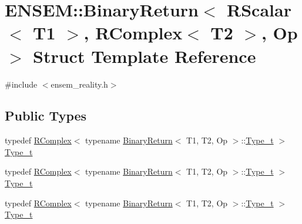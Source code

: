 \hypertarget{structENSEM_1_1BinaryReturn_3_01RScalar_3_01T1_01_4_00_01RComplex_3_01T2_01_4_00_01Op_01_4}{}\section{E\+N\+S\+EM\+:\+:Binary\+Return$<$ R\+Scalar$<$ T1 $>$, R\+Complex$<$ T2 $>$, Op $>$ Struct Template Reference}
\label{structENSEM_1_1BinaryReturn_3_01RScalar_3_01T1_01_4_00_01RComplex_3_01T2_01_4_00_01Op_01_4}


{\ttfamily \#include $<$ensem\+\_\+reality.\+h$>$}

\subsection*{Public Types}
\begin{DoxyCompactItemize}
\item 
typedef \mbox{\hyperlink{classENSEM_1_1RComplex}{R\+Complex}}$<$ typename \mbox{\hyperlink{structENSEM_1_1BinaryReturn}{Binary\+Return}}$<$ T1, T2, Op $>$\+::\mbox{\hyperlink{structENSEM_1_1BinaryReturn_3_01RScalar_3_01T1_01_4_00_01RComplex_3_01T2_01_4_00_01Op_01_4_ad277d696b0a4fe7ee7b2141ddac014e9}{Type\+\_\+t}} $>$ \mbox{\hyperlink{structENSEM_1_1BinaryReturn_3_01RScalar_3_01T1_01_4_00_01RComplex_3_01T2_01_4_00_01Op_01_4_ad277d696b0a4fe7ee7b2141ddac014e9}{Type\+\_\+t}}
\item 
typedef \mbox{\hyperlink{classENSEM_1_1RComplex}{R\+Complex}}$<$ typename \mbox{\hyperlink{structENSEM_1_1BinaryReturn}{Binary\+Return}}$<$ T1, T2, Op $>$\+::\mbox{\hyperlink{structENSEM_1_1BinaryReturn_3_01RScalar_3_01T1_01_4_00_01RComplex_3_01T2_01_4_00_01Op_01_4_ad277d696b0a4fe7ee7b2141ddac014e9}{Type\+\_\+t}} $>$ \mbox{\hyperlink{structENSEM_1_1BinaryReturn_3_01RScalar_3_01T1_01_4_00_01RComplex_3_01T2_01_4_00_01Op_01_4_ad277d696b0a4fe7ee7b2141ddac014e9}{Type\+\_\+t}}
\item 
typedef \mbox{\hyperlink{classENSEM_1_1RComplex}{R\+Complex}}$<$ typename \mbox{\hyperlink{structENSEM_1_1BinaryReturn}{Binary\+Return}}$<$ T1, T2, Op $>$\+::\mbox{\hyperlink{structENSEM_1_1BinaryReturn_3_01RScalar_3_01T1_01_4_00_01RComplex_3_01T2_01_4_00_01Op_01_4_ad277d696b0a4fe7ee7b2141ddac014e9}{Type\+\_\+t}} $>$ \mbox{\hyperlink{structENSEM_1_1BinaryReturn_3_01RScalar_3_01T1_01_4_00_01RComplex_3_01T2_01_4_00_01Op_01_4_ad277d696b0a4fe7ee7b2141ddac014e9}{Type\+\_\+t}}
\end{DoxyCompactItemize}


